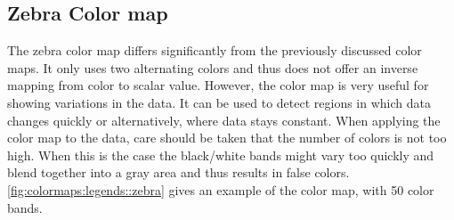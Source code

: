 \subsection{Zebra Color map} %
\label{sub:zebra_colormap}
The zebra color map differs significantly from the previously discussed color maps. It only uses two alternating colors and thus does not offer an inverse mapping from color to scalar value. However, the color map is very useful for showing variations in the data. It can be used to detect regions in which data changes quickly or alternatively, where data stays constant. When applying the color map to the data, care should be taken that the number of colors is not too high. When this is the case the black/white bands might vary too quickly and blend together into a gray area and thus results in false colors. \cref{fig:colormaps:legends::zebra} gives an example of the color map, with 50 color bands.